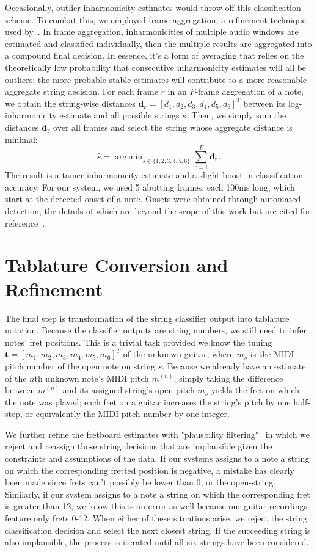 \documentclass[12pt]{cmuthesis}
\DeclareMathOperator*{\argmin}{arg\,min}
\begin{document}
Occasionally, outlier inharmonicity estimates would throw off this classification scheme. To combat this, we employed frame aggregation, a refinement technique used by~\cite{abesser2012}. In frame aggregation, inharmonicities of multiple audio windows are estimated and classified individually, then the multiple results are aggregated into a compound final decision. In essence, it's a form of averaging that relies on the theoretically low probability that consecutive inharmonicity estimates will all be outliers; the more probable stable estimates will contribute to a more reasonable aggregate string decision. For each frame $r$ in an $F$-frame aggregation of a note, we obtain the string-wise distances $\mathbf{d_r} = [d_1,d_2,d_3,d_4,d_5,d_6]^T$ between its log-inharmonicity estimate and all possible strings $s$. Then, we simply sum the distances $\mathbf{d_r}$ over all frames and select the string whose aggregate distance is minimal:
\begin{equation}
\hat{s} = \argmin_{s\in\{1,2,3,4,5,6\}}\sum_{r=1}^{F} \mathbf{d_r}.
\end{equation}
The result is a tamer inharmonicity estimate and a slight boost in classification accuracy. For our system, we used 5 abutting frames, each 100ms long, which start at the detected onset of a note. Onsets were obtained through automated detection, the details of which are beyond the scope of this work but are cited for reference~\cite{bello2005,dixon2006}.

\section{Tablature Conversion and Refinement}
The final step is transformation of the string classifier output into tablature notation. Because the classifier outputs are string numbers, we still need to infer notes' fret positions. This is a trivial task provided we know the tuning $\mathbf{t} = [m_1, m_2, m_3, m_4, m_5, m_6]^T$ of the unknown guitar, where $m_s$ is the MIDI pitch number of the open note on string $s$. Because we already have an estimate of the $n$th unknown note's MIDI pitch $m^{(n)}$, simply taking the difference between $m^{(n)}$ and its assigned string's open pitch $m_s$ yields the fret on which the note was played; each fret on a guitar increases the string's pitch by one half-step, or equivalently the MIDI pitch number by one integer.

We further refine the fretboard estimates with "plausbility filtering"~\cite{abesser2012} in which we reject and reassign those string decisions that are implausible given the constraints and assumptions of the data. If our systems assigns to a note a string on which the corresponding fretted position is negative, a mistake has clearly been made since frets can't possibly be lower than 0, or the open-string. Similarly, if our system assigns to a note a string on which the corresponding fret is greater than 12, we know this is an error as well because our guitar recordings feature only frets 0-12. When either of these situations arise, we reject the string classification decision and select the next closest string. If the succeeding string is also implausible, the process is iterated until all six strings have been considered.
\end{document}
